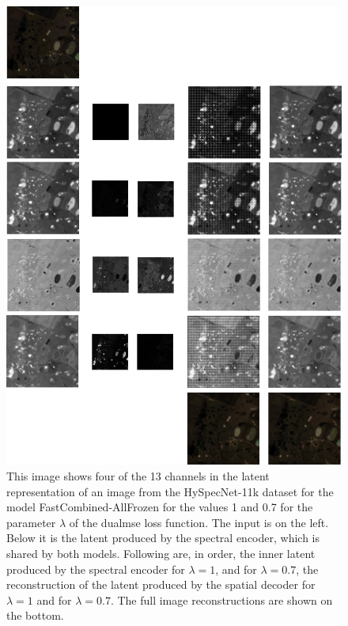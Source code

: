 \begin{figure}
\centering
\includegraphics[scale=0.6]{img/latents_2.png}
\caption{This image shows four of the 13 channels in the latent representation of an image from the HySpecNet-11k dataset for the model FastCombined-AllFrozen for the values 1 and 0.7 for the parameter $\lambda$ of the \ac{dualmse} loss function. The input is on the left. Below it is the latent produced by the spectral encoder, which is shared by both models. Following are, in order, the inner latent produced by the spectral encoder for $\lambda=1$, and for  $\lambda=0.7$, the reconstruction of the latent produced by the spatial decoder for $\lambda=1$ and for $\lambda=0.7$. The full image reconstructions are shown on the bottom.}
\label{fig:latentcompare}
\end{figure}

